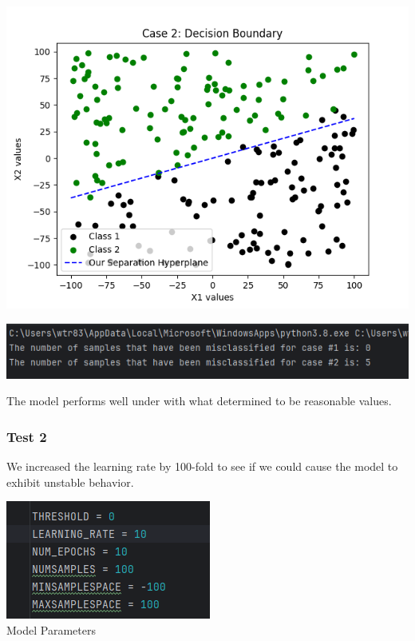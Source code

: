 \documentclass{article}
\begin{document}
\begin{center}
\includegraphics[scale=0.75]{../figs/T1.3.png} \\
\end{center}

\begin{center}
\includegraphics[scale=0.75]{../figs/T1.4.png} \\
\end{center}

The model performs well under with what determined to be reasonable values. 
\subsubsection{Test 2}
We increased the learning rate by 100-fold to see if we could cause the model to exhibit unstable behavior.

\begin{center}
\includegraphics[scale=0.75]{../figs/T2.1.png} \\
\caption{Model Parameters}
\end{center}
\end{document}
